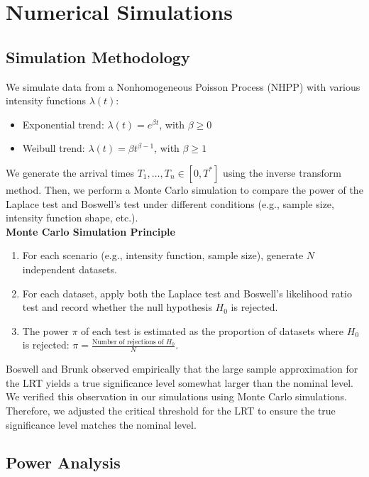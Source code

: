 \documentclass{journalstyle}
\begin{document}
\section{Numerical Simulations}

\subsection{Simulation Methodology}

We simulate data from a Nonhomogeneous Poisson Process (NHPP) with various intensity functions $\lambda(t)$:
\begin{itemize}
    \item Exponential trend: $\lambda(t) = e^{\beta t}$, with $\beta \geq 0$
    \item Weibull trend: $\lambda(t) = \beta t^{\beta - 1}$, with $\beta \geq 1$
\end{itemize}

We generate the arrival times $T_1, \ldots, T_n \in [0, T^*]$ using the inverse transform method.
Then, we perform a Monte Carlo simulation to compare the power of the Laplace test and Boswell's test under different conditions (e.g., sample size, intensity function shape, etc.). \\

\noindent\textbf{Monte Carlo Simulation Principle} \\
\begin{enumerate}
    \item For each scenario (e.g., intensity function, sample size), generate $N$ independent datasets.
    \item For each dataset, apply both the Laplace test and Boswell's likelihood ratio test and record whether the null hypothesis $H_0$ is rejected.
    \item The power $\pi$ of each test is estimated as the proportion of datasets where $H_0$ is rejected: $\pi = \frac{\text{Number of rejections of } H_0}{N}$.
\end{enumerate}

Boswell and Brunk \cite{Boswell1966} observed empirically that the large sample approximation for the LRT yields a true significance level somewhat larger than the nominal level.
We verified this observation in our simulations using Monte Carlo simulations.
Therefore, we adjusted the critical threshold for the LRT to ensure the true significance level matches the nominal level.



\subsection{Power Analysis}
\end{document}
